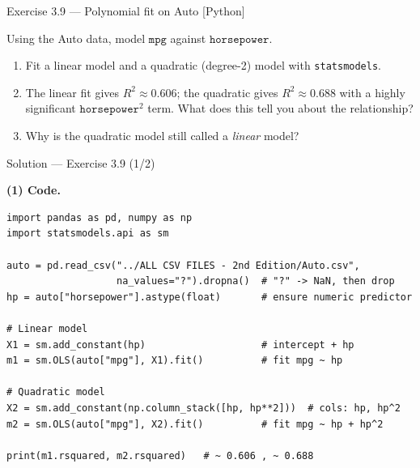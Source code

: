 \documentclass[aspectratio=169,11pt]{beamer}
\begin{document}
\begin{frame}[fragile]{Exercise 3.9 --- Polynomial fit on Auto [Python]}
  \begin{exercise}
    Using the Auto data, model $\texttt{mpg}$ against
    $\texttt{horsepower}$.
    \begin{enumerate}
      \item Fit a linear model and a quadratic (degree-2) model with
            \texttt{statsmodels}.
      \item The linear fit gives $R^2\approx 0.606$; the quadratic gives
            $R^2\approx 0.688$ with a highly significant
            $\texttt{horsepower}^2$ term. What does this tell you about
            the relationship?
      \item Why is the quadratic model still called a \emph{linear}
            model?
    \end{enumerate}
  \end{exercise}
\end{frame}

\begin{frame}[fragile]{Solution --- Exercise 3.9 (1/2)}
  \begin{solutionbox}
    \textbf{(1) Code.}
    \vspace{-2mm}
\begin{lstlisting}
import pandas as pd, numpy as np
import statsmodels.api as sm

auto = pd.read_csv("../ALL CSV FILES - 2nd Edition/Auto.csv",
                   na_values="?").dropna()  # "?" -> NaN, then drop
hp = auto["horsepower"].astype(float)       # ensure numeric predictor

# Linear model
X1 = sm.add_constant(hp)                    # intercept + hp
m1 = sm.OLS(auto["mpg"], X1).fit()          # fit mpg ~ hp

# Quadratic model
X2 = sm.add_constant(np.column_stack([hp, hp**2]))  # cols: hp, hp^2
m2 = sm.OLS(auto["mpg"], X2).fit()          # fit mpg ~ hp + hp^2

print(m1.rsquared, m2.rsquared)   # ~ 0.606 , ~ 0.688
\end{lstlisting}
  \end{solutionbox}
\end{frame}
\end{document}

